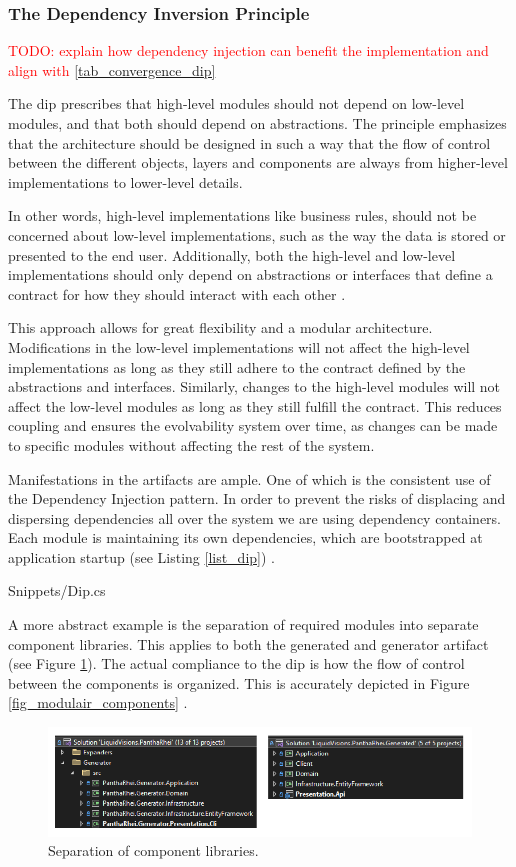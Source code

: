 \subsubsection{The Dependency Inversion Principle} \label{subsubsec_dip} 
\textcolor{red}{
TODO: explain how dependency injection can benefit the implementation and align with
\ref{tab_convergence_dip}}

The \gls{dip} prescribes that high-level modules should not depend on low-level modules,
and that both should depend on abstractions. The principle emphasizes that the
architecture should be designed in such a way that the flow of control between the
different objects, layers and components are always from higher-level implementations
to lower-level details.

In other words, high-level implementations like business rules, should not be concerned
about low-level implementations, such as the way the data is stored or presented to the
end user. Additionally, both the high-level and low-level implementations should only
depend on abstractions or interfaces that define a contract for how they should interact
with each other \parencite[109]{robert_c_martin_clean_2018}.

This approach allows for great flexibility and a modular architecture. Modifications in
the low-level implementations will not affect the high-level implementations as long as
they still adhere to the contract defined by the abstractions and interfaces.
Similarly, changes to the high-level modules will not affect the low-level modules as long
as they still fulfill the contract. This reduces coupling and ensures the evolvability
system over time, as changes can be made to specific modules without affecting the rest of
the system.

Manifestations in the artifacts are ample. One of which is the consistent use of the
Dependency Injection pattern. In order to prevent the risks of displacing and dispersing
dependencies all over the system \parencite[214]{mannaert_normalized_2016} we are using
dependency containers. Each module is maintaining its own dependencies, which are
bootstrapped at application startup (see Listing \ref{list_dip})
\parencite{koks_generator_2023}.


    {Snippets/Dip.cs}

A more abstract example is the separation of required modules into separate component
libraries. This applies to both the generated and generator artifact (see Figure
\ref{fig_solutions}). The actual compliance to the \gls{dip} is how the flow of control
between the components is organized. This is accurately depicted in Figure
\ref{fig_modulair_components} .

\begin{figure}[H]
    \centering
    \includegraphics[width=1\textwidth]{figures/solutions.pdf}
    \caption[Separation of component libraries]{Separation of component libraries.}
    \label{fig_solutions}
\end{figure}
